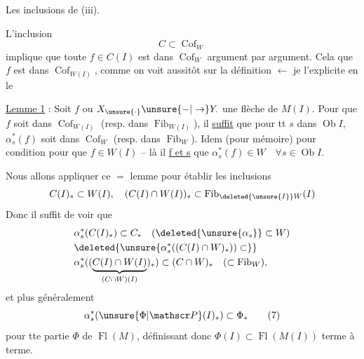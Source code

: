 \begingroup\makeatletter\tagsleft@true\makeatother
Les inclusions de (iii).

L'inclusion
\[
 C\subset\operatorname{Cof}_{W}
\]
implique que toute $f\in C(I)$ est dans $\operatorname{Cof}_{W}$ argument par argument. Cela  que $f$ est dans $\operatorname{Cof}_{W(I)}$, comme on voit aussitôt sur la définition $\leftarrow$ je l'explicite en le

\uline{Lemme 1} : Soit $f$ ou $X_{\unsure{\cdot}}\unsure{-|\to}Y_{\cdot}$ une flèche de $M(I)$. Pour que $f$ soit dans $\operatorname{Cof}_{W(I)}$ (resp. dans $\operatorname{Fib}_{W(I)}$), il \uline{suffit} que pour tt $s$ dans $\operatorname{Ob} I$, $\alpha_{s}^{*}(f)$ soit dans $\operatorname{Cof}_{W}$ (resp. dans $\operatorname{Fib}_{W}$). Idem (pour mémoire) pour  condition pour que  $f\in W(I)$ -- là il \uline{f et s} que $\alpha_{s}^{*}(f)\in W\quad\forall s\in\operatorname{Ob}I$.

Nous allons appliquer ce $=$ lemme pour  établir les inclusions
\[
 C(I)_{*}\subset W(I),\quad (C(I)\cap W(I))_{*}\subset\operatorname{Fib}_{\deleted{\unsure{I}}W}(I)
\]
Donc il suffit de voir que
\[
\begin{aligned}
 &\alpha_{s}^{*}(C(I)_{*})\subset C_{*}\quad(\deleted{\unsure{\alpha_s}}\subset W)\\
 &\deleted{\unsure{\alpha_{s}^{*}((C(I)\cap W)_{*}))\subset}}\\
 &\alpha_{s}^{*}((\underbrace{C(I)\cap W(I)}_{(C\cap W)(I)})_{*})\subset(C\cap W)_{*}\quad(\subset\operatorname{Fib}_{W}),
\end{aligned}
\]
et plus généralement
\[
 \alpha_{s}^{*}(\unsure{\Phi|\mathscr P}(I)_{*})\subset\Phi_{*}\tag*{(7)}
\]
pour tte \inserted{(!)} partie $\Phi$ de $\operatorname{Fl}(M)$, définissant donc $\Phi(I)\subset\operatorname{Fl}(M(I))$ terme à terme.
\endgroup
